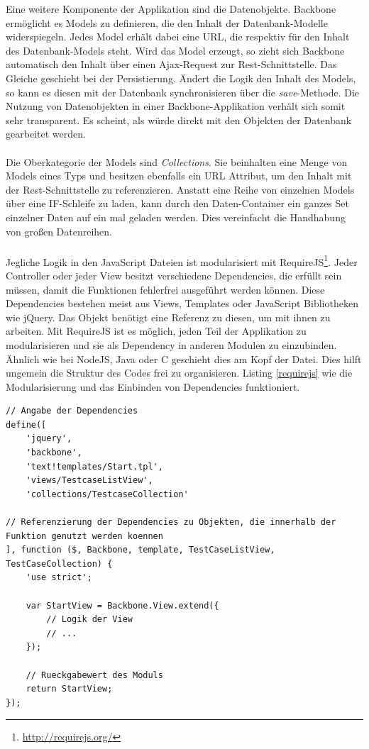 Eine weitere Komponente der Applikation sind die Datenobjekte. Backbone ermöglicht es Models zu definieren, die den Inhalt der Datenbank-Modelle widerspiegeln. Jedes Model erhält dabei eine URL, die respektiv für den Inhalt des Datenbank-Models steht. Wird das Model erzeugt, so zieht sich Backbone automatisch den Inhalt über einen Ajax-Request zur Rest-Schnittstelle. Das Gleiche geschieht bei der Persistierung. Ändert die Logik den Inhalt des Models, so kann es diesen mit der Datenbank synchronisieren über die \textit{save}-Methode. Die Nutzung von Datenobjekten in einer Backbone-Applikation verhält sich somit sehr transparent. Es scheint, als würde direkt mit den Objekten der Datenbank gearbeitet werden.\\
\\
Die Oberkategorie der Models sind \textit{Collections}. Sie beinhalten eine Menge von Models eines Typs und besitzen ebenfalls ein URL Attribut, um den Inhalt mit der Rest-Schnittstelle zu referenzieren. Anstatt eine Reihe von einzelnen Models über eine IF-Schleife zu laden, kann durch den Daten-Container ein ganzes Set einzelner Daten auf ein mal geladen werden. Dies vereinfacht die Handhabung von großen Datenreihen.\\
\\
Jegliche Logik in den JavaScript Dateien ist modularisiert mit RequireJS\footnote{\url{http://requirejs.org/}}. Jeder Controller oder jeder View besitzt verschiedene Dependencies, die erfüllt sein müssen, damit die Funktionen fehlerfrei ausgeführt werden können. Diese Dependencies bestehen meist aus Views, Templates oder JavaScript Bibliotheken wie jQuery. Das Objekt benötigt eine Referenz zu diesen, um mit ihnen zu arbeiten. Mit RequireJS ist es möglich, jeden Teil der Applikation zu modularisieren und sie als Dependency in anderen Modulen zu einzubinden. Ähnlich wie bei NodeJS, Java oder C geschieht dies am Kopf der Datei. Dies hilft ungemein die Struktur des Codes frei zu organisieren. Listing \ref{requirejs} wie die Modularisierung und das Einbinden von Dependencies funktioniert.

\vspace{1cm}
\begin{lstlisting}[caption=Modularisierung mit RequireJS,label=requirejs]
// Angabe der Dependencies
define([
    'jquery',
    'backbone',
    'text!templates/Start.tpl',
    'views/TestcaseListView',
    'collections/TestcaseCollection'
    
// Referenzierung der Dependencies zu Objekten, die innerhalb der Funktion genutzt werden koennen
], function ($, Backbone, template, TestCaseListView, TestCaseCollection) {
    'use strict';

    var StartView = Backbone.View.extend({
        // Logik der View
        // ...
    });

    // Rueckgabewert des Moduls
    return StartView;
});
\end{lstlisting}
\vspace{0.5cm}

